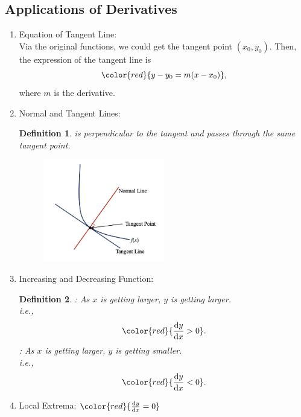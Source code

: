 \documentclass[12pt, a4paper]{article}
\newtheorem{definition}{Definition}[subsection]
\begin{document}
\subsection{Applications of Derivatives}
\begin{enumerate}
    \item Equation of Tangent Line: \\
    Via the original functions, we could get the tangent point $(x_0, y_0)$. Then, the expression of the tangent line is 
    $${\color{red}{y-y_0=m(x-x_0)}},$$ 
    where $m$ is the derivative. 
    \item Normal and Tangent Lines: 
    \begin{definition}
        \textbf{\color{red}{Normal}} is perpendicular to the tangent and passes through the same tangent point. 
        \begin{figure}[H]
            \centering 
            \includegraphics[width=0.5\textwidth]{Fig.5.4.jpg} 
        \end{figure}
    \end{definition}
    \item Increasing and Decreasing Function: 
    \begin{definition}
        \textbf{\color{red}{Increasing Function}}: As $x$ is getting larger, $y$ is getting larger.\\
        i.e., $${\color{red}{\frac{\mathrm{d}y}{\mathrm{d}x}>0}}.$$
        \textbf{\color{red}{Decreasing Function}}: As $x$ is getting larger, $y$ is getting smaller.\\
        i.e., $${\color{red}{\frac{\mathrm{d}y}{\mathrm{d}x}<0}}.$$
    \end{definition}
    \item Local Extrema: $\color{red}{\frac{\mathrm{d}y}{\mathrm{d}x}=0}$ {\color{red}{Stationary point}}\\
    {\color{green}{Global extrema is the maximum and the minimum points of the entire function.}}\\

\end{enumerate}
\end{document}
